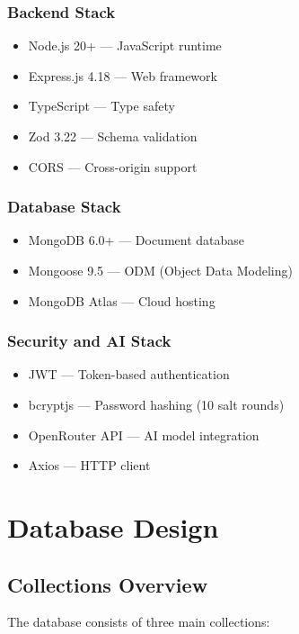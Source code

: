 \documentclass[12pt, a4paper, oneside]{report}
\begin{document}
\subsection{Backend Stack}
\begin{itemize}
  \item Node.js 20+ --- JavaScript runtime
  \item Express.js 4.18 --- Web framework
  \item TypeScript --- Type safety
  \item Zod 3.22 --- Schema validation
  \item CORS --- Cross-origin support
\end{itemize}

\subsection{Database Stack}
\begin{itemize}
  \item MongoDB 6.0+ --- Document database
  \item Mongoose 9.5 --- ODM (Object Data Modeling)
  \item MongoDB Atlas --- Cloud hosting
\end{itemize}

\subsection{Security and AI Stack}
\begin{itemize}
  \item JWT --- Token-based authentication
  \item bcryptjs --- Password hashing (10 salt rounds)
  \item OpenRouter API --- AI model integration
  \item Axios --- HTTP client
\end{itemize}

\chapter{Database Design}

\section{Collections Overview}

The database consists of three main collections:
\end{document}
